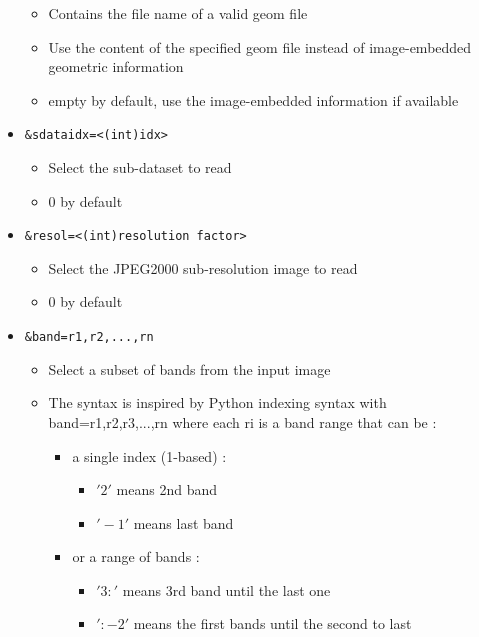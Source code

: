 \begin{itemize}
  \begin{itemize}
  \item Contains the file name of a valid geom file
  \item Use the content of the specified geom file instead of image-embedded
    geometric information
  \item empty by default, use the image-embedded information if available
  \end{itemize}  
\item \begin{verbatim}&sdataidx=<(int)idx>\end{verbatim}
  \begin{itemize}
  \item Select the sub-dataset to read
  \item 0 by default
  \end{itemize}
\item \begin{verbatim}&resol=<(int)resolution factor>\end{verbatim}
  \begin{itemize}
  \item Select the JPEG2000 sub-resolution image to read
  \item 0 by default
  \end{itemize}
\item \begin{verbatim}&band=r1,r2,...,rn\end{verbatim}
\begin{itemize}
    \item Select a subset of bands from the input image
    \item The syntax is inspired by Python indexing syntax with
      band=r1,r2,r3,...,rn  where each ri is a band range that can be :
      \begin{itemize}
      \item a single index (1-based) :
        \begin{itemize}
          \item $'2'$ means 2nd band
          \item $'-1'$ means last band
          \end{itemize}
        \item or a range of bands :
          \begin{itemize}
            \item $'3:'$ means 3rd band until the last one
            \item $':-2'$ means the first bands until the second to last

\end{itemize}
\end{itemize}
\end{itemize}
\end{itemize}
